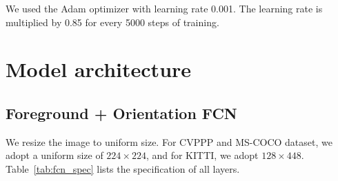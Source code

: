 We used the Adam optimizer with learning rate 0.001. 
The learning rate is multiplied by
0.85 for every 5000 steps of training.

\section{Model architecture}

\subsection{Foreground + Orientation FCN}

We resize the image to uniform size. For CVPPP and MS-COCO dataset, we adopt a
uniform size of $224\times224$, and for KITTI, we adopt $128\times448$.
Table~\ref{tab:fcn_spec} lists the specification of all layers.

